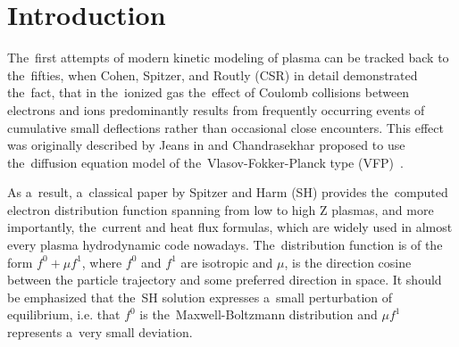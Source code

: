 \section{Introduction}
\label{sec:Intro}

The~first attempts of modern kinetic modeling of plasma can be tracked back 
to the~fifties, when Cohen, Spitzer, and Routly (CSR) \cite{CSR_1950} 
in detail demonstrated the~fact, that in the~ionized gas the~effect of 
Coulomb collisions between electrons and ions predominantly results 
from frequently occurring events of cumulative small deflections 
rather than occasional close encounters. This effect was originally described
by Jeans in \cite{Jeans_BOOK1929} and 
Chandrasekhar \cite{Chandrasekhar_RMP1943} 
proposed to use the~diffusion equation model of the~Vlasov-Fokker-Planck type 
(VFP)~\cite{Planck_1917}.

As a~result, a~classical paper by Spitzer and Harm (SH) 
\cite{SpitzerHarm_PR1953} provides the~computed electron distribution function
spanning from low to high Z plasmas, and more importantly, the~current and 
heat flux formulas, which are widely used in almost every plasma hydrodynamic
code nowadays.
The~distribution function is of the form $f^0+\mu f^1$, where $f^0$ and $f^1$ 
are isotropic and $\mu$, is the direction cosine between the particle 
trajectory and some preferred direction in space. It should be emphasized that
the~SH solution expresses a~small perturbation of equilibrium, i.e. that 
$f^0$ is the~Maxwell-Boltzmann distribution and $\mu f^1$ represents 
a~very small deviation.

